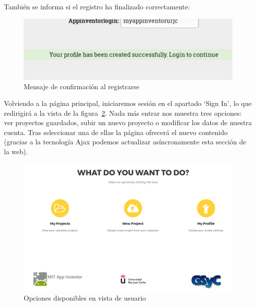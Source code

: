 \documentclass[a4paper, 12pt]{book}
\begin{document}
También se informa si el registro ha finalizado correctamente:
\begin{figure}[H]
  \centering
  \includegraphics[width=0.70\linewidth, keepaspectratio]{img/createUserOK}
  \caption{Mensaje de confirmación al registrarse}
  \label{fig:createUserOK}
\end{figure}

Volviendo a la página principal, iniciaremos sesión en el apartado `Sign In', lo que redirigirá a la vista de la figura~\ref{fig:userView}. Nada más entrar nos muestra tres opciones: ver proyectos guardados, subir un nuevo proyecto o modificar los datos de nuestra cuenta. Tras seleccionar una de ellas la página ofrecerá el nuevo contenido (gracias a la tecnología Ajax podemos actualizar asíncronamente esta sección de la web).
\begin{figure}[H]
  \centering
  \includegraphics[width=0.90\linewidth, keepaspectratio]{img/userView}
  \caption{Opciones disponibles en vista de usuario}
  \label{fig:userView}
\end{figure}
\end{document}
